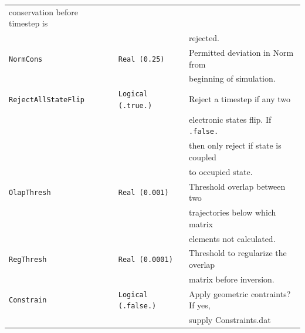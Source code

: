\documentclass[11pt]{article}
\begin{document}
\begin{table}[h]
\begin{tabular}{ l l l }
                                                      {\small conservation before timestep is}\\&&
                                                      {\small rejected.}\\
{\tt NormCons}          & {\tt Real (0.25)}         & {\small Permitted deviation in Norm from}\\&&
                                                      {\small beginning of simulation.}\\
{\tt RejectAllStateFlip}& {\tt Logical (.true.)}    & {\small Reject a timestep if any two}\\&&
                                                      {\small electronic states flip. If {\tt .false.}}\\&&
                                                      {\small then only reject if state is coupled}\\&&
                                                      {\small to occupied state.}\\
{\tt OlapThresh}        & {\tt Real (0.001)}        & {\small Threshold overlap between two}\\&&
                                                      {\small trajectories below which matrix}\\&&
                                                      {\small elements not calculated.}\\
{\tt RegThresh}         & {\tt Real (0.0001)}       & {\small Threshold to regularize the overlap}\\&&
                                                      {\small matrix before inversion.}\\
{\tt Constrain}         & {\tt Logical (.false.)}   & {\small Apply geometric contraints? If yes,}\\&&
                                                      {\small supply Constraints.dat}\\

\hline\hline
\end{tabular}
\end{table}
\end{document}
